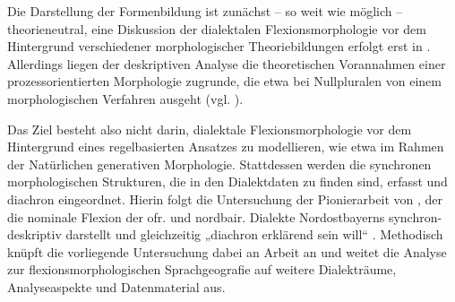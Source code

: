 Die Darstellung der Formenbildung ist zunächst -- so weit wie möglich -- theorieneutral, eine Diskussion der dialektalen Flexionsmorphologie vor dem Hintergrund verschiedener morphologischer Theoriebildungen erfolgt erst in . Allerdings liegen der deskriptiven Analyse die theoretischen Vorannahmen einer prozessorientierten Morphologie zugrunde, die etwa bei Nullpluralen von einem morphologischen Verfahren ausgeht (vgl. ).


Das Ziel besteht also nicht darin, dialektale Flexionsmorphologie vor dem Hintergrund eines regelbasierten Ansatzes zu modellieren, wie etwa \citet{Harnisch1987} im Rahmen der Natürlichen generativen Morphologie. Stattdessen werden die synchronen morphologischen Strukturen, die in den Dialektdaten zu finden sind, erfasst und diachron eingeordnet. Hierin folgt die Untersuchung der Pionierarbeit von \citet{Rowley1997}, der die nominale Flexion der ofr. und nordbair. Dialekte Nordostbayerns synchron-deskriptiv darstellt und gleichzeitig „diachron erklärend sein will“ \citep[2]{Rowley1997}. Methodisch knüpft die vorliegende Untersuchung dabei an  Arbeit an und weitet die Analyse zur flexionsmorphologischen Sprachgeografie auf weitere Dialekträume, Analyseaspekte und Datenmaterial aus.
